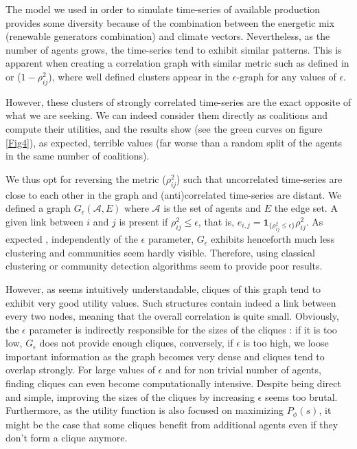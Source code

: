 \documentclass[conference]{IEEEtran}
\begin{document}
The model we used in order to simulate time-series of available production provides some diversity because of the combination between the energetic mix (renewable generators combination) and climate vectors. Nevertheless, as the number of agents grows, the time-series tend to exhibit similar patterns. This is apparent when creating a correlation graph with similar metric such as defined in \cite{Garas2008} or \cite{Onnela2004} ($ 1 - \rho_{ij}^{2} $), where well defined clusters appear in the $ \epsilon $-graph for any values of $ \epsilon $. 

However, these clusters of strongly correlated time-series are the exact opposite of what we are seeking. We can indeed consider them directly as coalitions and compute their utilities, and the results show (see the green curves on figure \ref{Fig4}), as expected, terrible values (far worse than a random split of the agents in the same number of coalitions).

We thus opt for reversing the metric ($ \rho_{ij}^{2} $) such that uncorrelated time-series are close to each other in the graph and (anti)correlated time-series are distant. We defined a graph $G_\epsilon(\mathcal{A},E)$ where $\mathcal{A}$ is the set of agents and $ E $ the edge set. A given link between $ i $ and $ j $ is present if $ \rho_{ij}^{2} \leq \epsilon $, that is, $ e_{i,j} = \mathbf{1}_{\{\rho_{ij}^{2} \leq \epsilon \}}\rho_{ij}^{2} $. As expected \cite{Onnela2004}, independently of the $ \epsilon $ parameter, $ G_{\epsilon } $ exhibits henceforth much less clustering and communities seem hardly visible. Therefore, using classical clustering or community detection algorithms seem to provide poor results. 

However, as seems intuitively understandable, cliques of this graph tend to exhibit very good utility values. Such  structures contain indeed a link between every two nodes, meaning that the overall correlation is quite small. Obviously, the $ \epsilon $ parameter is indirectly responsible for the sizes of the cliques : if it is too low, $ G_{\epsilon} $ does not provide enough cliques, conversely, if $\epsilon $ is too high, we loose important information as the graph becomes very dense and cliques tend to overlap strongly. For large values of $ \epsilon $ and for non trivial number of agents, finding cliques can even become computationally intensive. Despite being direct and simple, improving the sizes of the cliques by increasing $ \epsilon $ seems too brutal. Furthermore, as the utility function is also focused on maximizing $ P_{\phi}(s) $, it might be the case that some cliques benefit from additional agents even if they don't form a clique anymore.
\end{document}
